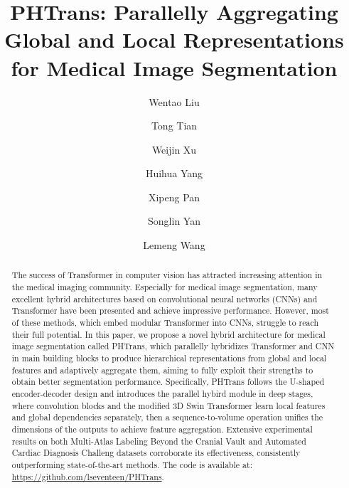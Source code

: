 \documentclass[runningheads]{llncs}
\begin{document}
\title{PHTrans: Parallelly Aggregating Global and Local Representations for Medical Image Segmentation}


\author{Wentao Liu\and Tong Tian\and Weijin Xu \and Huihua Yang   \and Xipeng Pan \and Songlin Yan \and Lemeng Wang}








\maketitle           \begin{abstract}


The success of Transformer in computer vision has attracted increasing attention in the medical imaging community. Especially for medical image segmentation, many excellent hybrid architectures based on convolutional neural networks (CNNs) and Transformer have been presented and achieve impressive performance. However, most of these methods, which embed modular Transformer into CNNs, struggle to reach their full potential. In this paper, we propose a novel hybrid architecture for medical image segmentation called PHTrans, which parallelly hybridizes Transformer and CNN in main building blocks to produce hierarchical representations from global and local features and adaptively aggregate them, aiming to fully exploit their strengths to obtain better segmentation performance. Specifically, PHTrans follows the U-shaped encoder-decoder design and introduces the parallel hybird module in deep stages, where convolution blocks and the modified 3D Swin Transformer learn local features and global dependencies separately, then a sequence-to-volume operation unifies the dimensions of the outputs to achieve feature aggregation. Extensive experimental results on both Multi-Atlas Labeling Beyond the Cranial Vault and Automated Cardiac Diagnosis Challeng datasets corroborate its effectiveness, consistently outperforming state-of-the-art methods. 
The code is available at: \url{https://github.com/lseventeen/PHTrans}.



\end{abstract}
\end{document}
